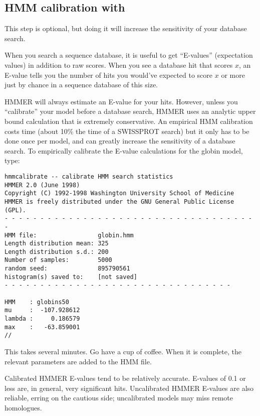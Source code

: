 \subsection{HMM calibration with }

This step is optional, but doing it will increase the sensitivity of
your database search.

When you search a sequence database, it is useful to get ``E-values''
(expectation values) in addition to raw scores. When you see a
database hit that scores $x$, an E-value tells you the number of hits
you would've expected to score $x$ or more just by chance in a
sequence database of this size. 

HMMER will always estimate an E-value for your hits. However, unless
you ``calibrate'' your model before a database search, HMMER uses an
analytic upper bound calculation that is extremely conservative.  An
empirical HMM calibration costs time (about 10\% the time of a
SWISSPROT search) but it only has to be done once per model, and can
greatly increase the sensitivity of a database search. To empirically
calibrate the E-value calculations for the globin model, type:

\vspace{1.5em}
\vspace{-1.5em}
{\small\begin{verbatim}
hmmcalibrate -- calibrate HMM search statistics
HMMER 2.0 (June 1998)
Copyright (C) 1992-1998 Washington University School of Medicine
HMMER is freely distributed under the GNU General Public License (GPL).
- - - - - - - - - - - - - - - - - - - - - - - - - - - - - - - - - - - -
HMM file:                 globin.hmm
Length distribution mean: 325
Length distribution s.d.: 200
Number of samples:        5000
random seed:              895790561
histogram(s) saved to:    [not saved]
- - - - - - - - - - - - - - - - - - - - - - - - - - - - - - - -

HMM    : globins50
mu     :  -107.928612
lambda :     0.186579
max    :   -63.859001
//
\end{verbatim}}

This takes several minutes. Go have a cup of coffee. When it is
complete, the relevant parameters are added to the HMM file.

Calibrated HMMER E-values tend to be relatively accurate. E-values of
0.1 or less are, in general, very significant hits. Uncalibrated HMMER
E-values are also reliable, erring on the cautious side; uncalibrated
models may miss remote homologues.

